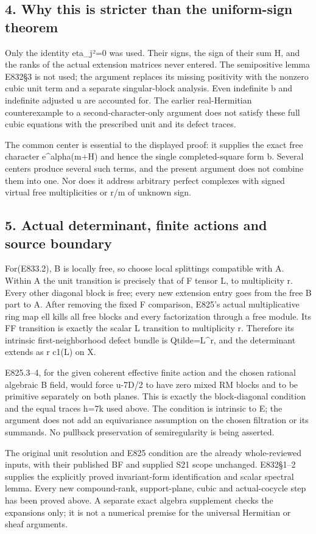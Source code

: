 \subsection{4. Why this is stricter than the uniform-sign
theorem}\label{SF-E833:why-this-is-stricter-than-the-uniform-sign-theorem}

Only the identity eta\_j²=0 was used. Their signs, the sign of their sum
H, and the ranks of the actual extension matrices never entered. The
semipositive lemma E832§3 is not used; the argument replaces its missing
positivity with the nonzero cubic unit term and a separate
singular-block analysis. Even indefinite b and indefinite adjusted u are
accounted for. The earlier real-Hermitian counterexample to a
second-character-only argument does not satisfy these full cubic
equations with the prescribed unit and its defect traces.

The common center is essential to the displayed proof: it supplies the
exact free character e\^{}alpha(m+H) and hence the single
completed-square form b. Several centers produce several such terms, and
the present argument does not combine them into one. Nor does it address
arbitrary perfect complexes with signed virtual free multiplicities or
r/m of unknown sign.

\subsection{5. Actual determinant, finite actions and source
boundary}\label{SF-E833:actual-determinant-finite-actions-and-source-boundary}

For(E833.2), B is locally free, so choose local splittings compatible
with A. Within A the unit transition is precisely that of F tensor L, to
multiplicity r. Every other diagonal block is free; every new extension
entry goes from the free B part to A. After removing the fixed F
comparison, E825's actual multiplicative ring map ell kills all free
blocks and every factorization through a free module. Its FF transition
is exactly the scalar L transition to multiplicity r. Therefore its
intrinsic first-neighborhood defect bundle is Qtilde=L\^{}r, and the
determinant extends as r c1(L) on X.

E825.3--4, for the given coherent effective finite action and the chosen
rational algebraic B field, would force u-7D/2 to have zero mixed RM
blocks and to be primitive separately on both planes. This is exactly
the block-diagonal condition and the equal traces h=7k used above. The
condition is intrinsic to E; the argument does not add an equivariance
assumption on the chosen filtration or its summands. No pullback
preservation of semiregularity is being asserted.

The original unit resolution and E825 condition are the already
whole-reviewed inputs, with their published BF and supplied S21 scope
unchanged. E832§1--2 supplies the explicitly proved invariant-form
identification and scalar spectral lemma. Every new compound-rank,
support-plane, cubic and actual-cocycle step has been proved above. A
separate exact algebra supplement checks the expansions only; it is not
a numerical premise for the universal Hermitian or sheaf arguments.
